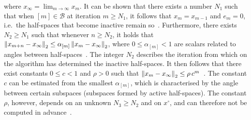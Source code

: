 where $x_\infty=\lim_{m\rightarrow\infty}x_m$. It can be shown that there exists a number $N_1$ such that when $[m]\in \mathcal{B}$ at iteration $m\geq N_1$, it follows that $x_m=x_{m-1}$ and $e_m=0$, i.e.\ the half-spaces that become inactive remain so~\cite[Lemma~3.1]{DYKSTRAPOLY}. Furthermore, there exists $N_2\geq N_1$ such that whenever $n\geq N_2$, it holds that $\left\| x_{m+n}-x_\infty \right\|_2\leq\alpha_{[m]}\left\| x_m-x_\infty \right\|_2$, where $0\leq\alpha_{[m]}<1$ are scalars related to angles between half-spaces~\cite[Lemma~3.7]{DYKSTRAPOLY}. The integer $N_2$ describes the iteration from which on the algorithm has determined the inactive half-spaces. It then follows that there exist constants $0\leq c < 1$ and $\rho > 0$ such that $\left\| x_m -x_\infty \right\|_2 \leq \rho\, c^m$~\cite[Thm.~3.8]{DYKSTRAPOLY}. The constant $c$ can be estimated from the smallest $\alpha_{[m]}$, which is characterised by the angle between certain subspaces (subspaces formed by active half-spaces). The constant $\rho$, however, depends on an unknown $N_3\geq N_2$ and on $x^\circ$, and can therefore not be computed in advance~\cite{DYKSTRAPERKINS,XUPOLY}. %


